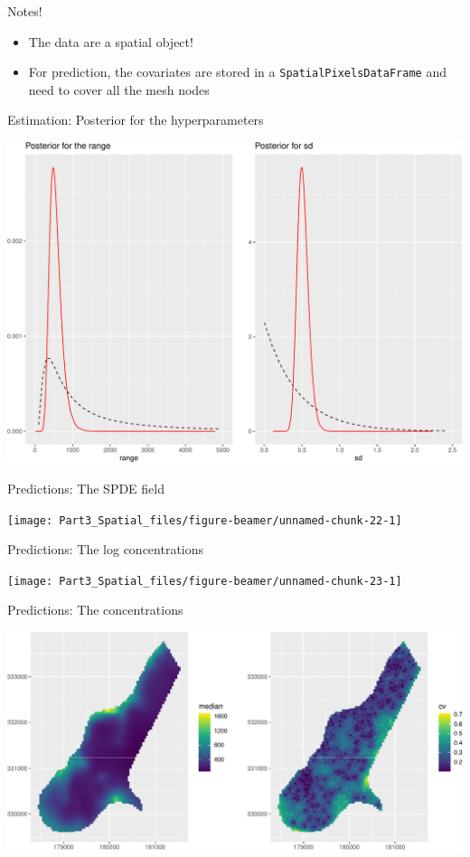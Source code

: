 \documentclass[
  ignorenonframetext,
]{beamer}
\begin{document}
\begin{frame}[fragile]{Notes!}
\protect\hypertarget{notes}{}
\begin{itemize}
\item
  The data are a spatial object!
\item
  For prediction, the covariates are stored in a
  \texttt{SpatialPixelsDataFrame} and need to cover all the mesh nodes
\end{itemize}
\end{frame}

\begin{frame}{Estimation: Posterior for the hyperparameters}
\protect\hypertarget{estimation-posterior-for-the-hyperparameters}{}
\begin{center}\includegraphics[width=0.6\linewidth]{Part3_Spatial_files/figure-beamer/unnamed-chunk-20-1} \end{center}
\end{frame}

\begin{frame}{Predictions: The SPDE field}
\protect\hypertarget{predictions-the-spde-field}{}
\begin{center}\texttt{[image: Part3\_Spatial\_files/figure-beamer/unnamed-chunk-22-1]} \end{center}
\end{frame}

\begin{frame}{Predictions: The log concentrations}
\protect\hypertarget{predictions-the-log-concentrations}{}
\begin{center}\texttt{[image: Part3\_Spatial\_files/figure-beamer/unnamed-chunk-23-1]} \end{center}
\end{frame}

\begin{frame}{Predictions: The concentrations}
\protect\hypertarget{predictions-the-concentrations}{}
\begin{center}\includegraphics[width=0.8\linewidth]{Part3_Spatial_files/figure-beamer/unnamed-chunk-24-1} \end{center}
\end{frame}
\end{document}
